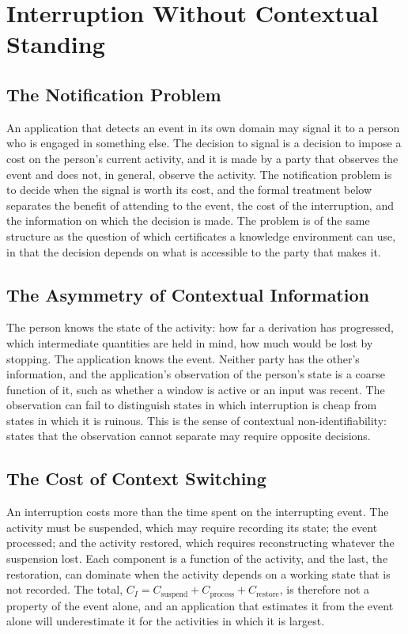 \documentclass[11pt,letterpaper]{report}
\theoremstyle{plain}
\theoremstyle{definition}
\theoremstyle{remark}
\begin{document}
\chapter{Interruption Without Contextual Standing}

\section{The Notification Problem}

An application that detects an event in its own domain may signal it to a person who is engaged in something else. The decision to signal is a decision to impose a cost on the person's current activity, and it is made by a party that observes the event and does not, in general, observe the activity. The notification problem is to decide when the signal is worth its cost, and the formal treatment below separates the benefit of attending to the event, the cost of the interruption, and the information on which the decision is made. The problem is of the same structure as the question of which certificates a knowledge environment can use, in that the decision depends on what is accessible to the party that makes it.

\section{The Asymmetry of Contextual Information}

The person knows the state of the activity: how far a derivation has progressed, which intermediate quantities are held in mind, how much would be lost by stopping. The application knows the event. Neither party has the other's information, and the application's observation of the person's state is a coarse function of it, such as whether a window is active or an input was recent. The observation can fail to distinguish states in which interruption is cheap from states in which it is ruinous. This is the sense of contextual non-identifiability: states that the observation cannot separate may require opposite decisions.

\section{The Cost of Context Switching}

An interruption costs more than the time spent on the interrupting event. The activity must be suspended, which may require recording its state; the event processed; and the activity restored, which requires reconstructing whatever the suspension lost. Each component is a function of the activity, and the last, the restoration, can dominate when the activity depends on a working state that is not recorded. The total, $C_I=C_{\mathrm{suspend}}+C_{\mathrm{process}}+C_{\mathrm{restore}}$, is therefore not a property of the event alone, and an application that estimates it from the event alone will underestimate it for the activities in which it is largest.
\end{document}
